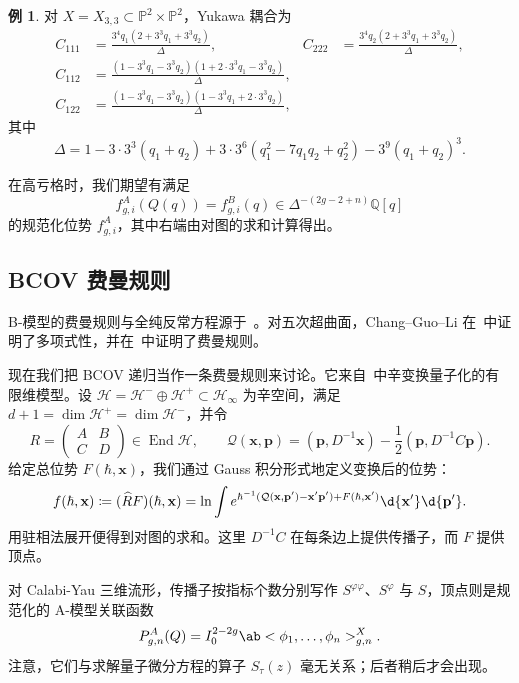 \documentclass{amsart}
\theoremstyle{definition}
\newtheorem{exm}[thm]{例}
\theoremstyle{remark}
\theoremstyle{plain}
\theoremstyle{definition}
\theoremstyle{remark}
\newcommand{\Q}{\mathbb{Q}}
\renewcommand{\P}{\mathbb{P}}
\newcommand{\mc}[1]{\mathcal{#1}}
\newcommand{\mbf}[1]{\mathbf{#1}}
\newcommand{\bp}{\mbf{p}}
\newcommand{\wh}[1]{\widehat{#1}}
\newcommand{\1}{\mathbf{1}}
\newcommand{\2}{\mathbf{2}}
\newcommand{\3}{\mathbf{3}}
\DeclareMathOperator{\End}{End}
\begin{document}
\begin{exm}
    对 \(X = X_{3,3} \subset \P^2 \times \P^2\)，Yukawa 耦合为
    \begin{align*}
        C_{111} &= \frac{3^4 q_1 (2+3^3q_1+3^3q_2)}{\Delta}, & C_{222} &= \frac{3^4 q_2(2+3^3q_1+3^3q_2)}{\Delta}, \\
        C_{112} &= \frac{(1-3^3q_1-3^3q_2)(1+2\cdot 3^3 q_1 - 3^3 q_2)}{\Delta}, \\
        C_{122} &= \frac{(1-3^3q_1-3^3q_2)(1-3^3q_1+2\cdot3^3q_2)}{\Delta},
    \end{align*}
    其中
    \[ \Delta = 1 - 3\cdot3^3(q_1+q_2) + 3\cdot3^6(q_1^2 - 7q_1q_2+q_2^2) - 3^9(q_1+q_2)^3. \]
\end{exm}

在高亏格时，我们期望有满足
\[ f^A_{g,i}(Q(q)) = f^B_{g,i}(q) \in \Delta^{-(2g-2+n)}\Q[q] \]
的规范化位势 \(f^A_{g,i}\)，其中右端由对图的求和计算得出。

\subsection{BCOV 费曼规则}%
\label{sub:The BCOV Feynman rule}

B-模型的费曼规则与全纯反常方程源于~\cite{BCOV1994}。对五次超曲面，Chang--Guo--Li 在~\cite{CGL2021}中证明了多项式性，并在~\cite{CGL2026}中证明了费曼规则。

现在我们把 BCOV 递归当作一条费曼规则来讨论。它来自~中辛变换量子化的有限维模型。设 \(\mc{H} = \mc{H}^- \oplus \mc{H}^+ \subset \mc{H}_{\infty}\) 为辛空间，满足 \(d+1 = \dim \mc{H}^+ = \dim \mc{H}^-\)，并令
\[ R = \begin{pmatrix} A & B \\ C & D \end{pmatrix} \in \End \mc{H}, \qquad \mc{Q}(\mbf{x},\bp) = (\bp, D^{-1}\mbf{x}) - \frac{1}{2}(\bp, D^{-1}C\bp). \]
给定总位势 \(F(\hbar, \mbf{x})\)，我们通过 Gauss 积分形式地定义变换后的位势：
\[ f(\hbar, \mbf{x}) \coloneqq (\wh{R}F)(\hbar,\mbf{x}) = \ln \int e^{\hbar^{-1}(\mc{Q}(\mbf{x},\bp') - \mbf{x}'\bp') + F(\hbar,\mbf{x}')}\d{\mbf{x}'}\d{\bp'}. \]
用驻相法展开便得到对图的求和。这里 \(D^{-1}C\) 在每条边上提供传播子，而 \(F\) 提供顶点。

对 Calabi-Yau 三维流形，传播子按指标个数分别写作 \(S^{\varphi\varphi}\)、\(S^{\varphi}\) 与 \(S\)，顶点则是规范化的 A-模型关联函数
\[ P^A_{g,n}(Q) = I_0^{2-2g}\ab<\phi_1, \ldots, \phi_n>^X_{g,n}. \]
注意，它们与求解量子微分方程的算子 \(S_{\tau}(z)\) 毫无关系；后者稍后才会出现。
\end{document}
